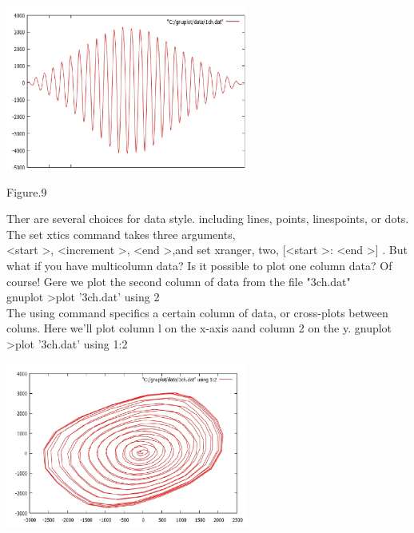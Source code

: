 \documentclass[onecolumn,journal] {IEEEtran}
\begin{document}
 \center
\includegraphics[width=8cm]{3ch.jpg}
\begin{center}
\end{center} 
\begin{center}
Figure.9
\end{center}
\begin{flushleft}
Ther are  several choices for data style. including lines, points, linespoints, or dots. The set xtics command takes three arguments,   \\
  \textless      start    \textgreater     ,     \textless    increment  \textgreater    ,    \textless end  \textgreater   ,and set xranger, two, 
    [\textless     start  \textgreater  :  \textless  end  \textgreater] .  
But what if you have multicolumn data? Is it possible to plot one column data? Of course! Gere we plot the second  column of data from the file "3ch.dat"\\ 
gnuplot \textgreater plot '3ch.dat' using 2 \\
The using command specifics a certain column of data, or cross-plots between coluns. Here we'll plot column l on the x-axis aand column 2 on the y.
\newline
\newline
gnuplot  \textgreater plot '3ch.dat' using 1:2
\end{flushleft}
 \center
\includegraphics[width=8cm]{sinx.jpg}
\begin{center}
\end{center} 
\end{document}
